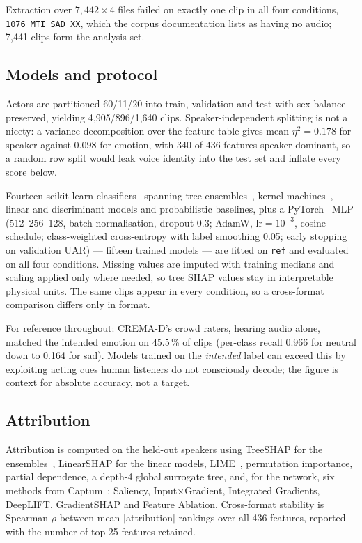 \documentclass[a4paper,9pt,twocolumn]{extarticle}
\newcommand{\ft}[1]{\texttt{\footnotesize #1}}
\begin{document}
Extraction over $7{,}442\times4$ files failed on exactly one clip in all four
conditions, \ft{1076\_MTI\_SAD\_XX}, which the corpus documentation lists as
having no audio; 7{,}441 clips form the analysis set.

\subsection{Models and protocol}
Actors are partitioned 60/11/20 into train, validation and test with sex
balance preserved, yielding 4{,}905/896/1{,}640 clips. Speaker-independent
splitting is not a nicety: a variance decomposition over the feature table gives
mean $\eta^2=0.178$ for speaker against $0.098$ for emotion, with 340 of 436
features speaker-dominant, so a random row split would leak voice identity into
the test set and inflate every score below.

Fourteen scikit-learn classifiers~\cite{pedregosa2011sklearn} spanning tree
ensembles~\cite{breiman2001rf,chen2016xgboost,ke2017lightgbm,friedman2001gbm},
kernel machines~\cite{cortes1995svm}, linear and discriminant models and
probabilistic baselines, plus a PyTorch~\cite{paszke2019pytorch} MLP
(512--256--128, batch normalisation, dropout 0.3; AdamW, $\text{lr}=10^{-3}$,
cosine schedule; class-weighted cross-entropy with label smoothing 0.05; early
stopping on validation UAR) --- fifteen trained models --- are fitted on
\ft{ref} and evaluated on all four conditions. Missing values are imputed with
training medians and scaling applied only where needed, so tree SHAP values
stay in interpretable physical units. The same clips appear in every condition,
so a cross-format comparison differs only in format.

For reference throughout: CREMA-D's crowd raters, hearing audio alone, matched
the intended emotion on 45.5\,\% of clips (per-class recall 0.966 for neutral
down to 0.164 for sad). Models trained on the \emph{intended} label can exceed
this by exploiting acting cues human listeners do not consciously decode; the
figure is context for absolute accuracy, not a target.

\subsection{Attribution}
Attribution is computed on the held-out speakers using TreeSHAP for the
ensembles~\cite{lundberg2020treeshap}, LinearSHAP for the linear models,
LIME~\cite{ribeiro2016lime}, permutation importance, partial dependence, a
depth-4 global surrogate tree, and, for the network, six methods from
Captum~\cite{kokhlikyan2020captum}: Saliency, Input$\times$Gradient, Integrated
Gradients, DeepLIFT, GradientSHAP and Feature Ablation. Cross-format stability
is Spearman $\rho$ between mean-$|$attribution$|$ rankings over all 436
features, reported with the number of top-25 features retained.
\end{document}
